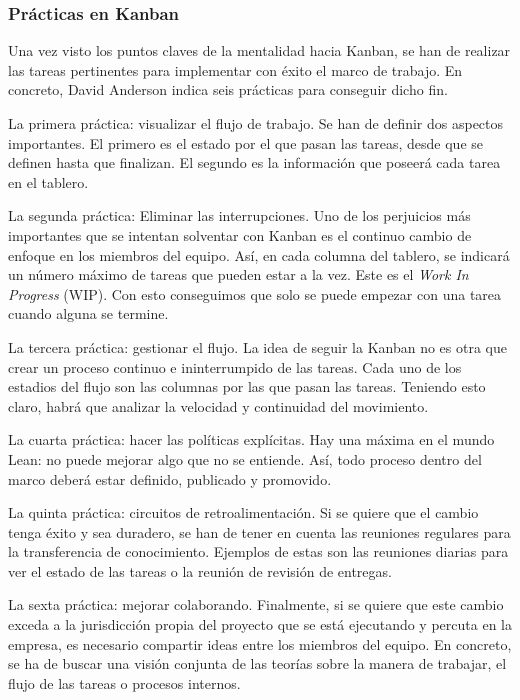 
\subsubsection{Prácticas en Kanban}
Una vez visto los puntos claves de la mentalidad hacia Kanban, se han de realizar las tareas pertinentes para implementar con éxito el marco de trabajo. En concreto, David Anderson indica seis prácticas para conseguir dicho fin.

La primera práctica: visualizar el flujo de trabajo. Se han de definir dos aspectos importantes. El primero es el estado por el que pasan las tareas, desde que se definen hasta que finalizan. El segundo es la información que poseerá cada tarea en el tablero.

La segunda práctica: Eliminar las interrupciones. Uno de los perjuicios más importantes que se intentan solventar con Kanban es el continuo cambio de enfoque en los miembros del equipo. Así, en cada columna del tablero, se indicará un número máximo de tareas que pueden estar a la vez. Este es el \textit{Work In Progress} (WIP). Con esto conseguimos que solo se puede empezar con una tarea cuando alguna se termine.

La tercera práctica: gestionar el flujo. La idea de seguir la Kanban no es otra que crear un proceso continuo e ininterrumpido de las tareas. Cada uno de los estadios del flujo son las columnas por las que pasan las tareas. Teniendo esto claro, habrá que analizar la velocidad y continuidad del movimiento.

La cuarta práctica: hacer las políticas explícitas. Hay una máxima en el mundo Lean: no puede mejorar algo que no se entiende. Así, todo proceso dentro del marco deberá estar definido, publicado y promovido.

La quinta práctica: circuitos de retroalimentación. Si se quiere que el cambio tenga éxito y sea duradero, se han de tener en cuenta las reuniones regulares para la transferencia de conocimiento. Ejemplos de estas son las reuniones diarias para ver el estado de las tareas o la reunión de revisión de entregas.

La sexta práctica: mejorar colaborando. Finalmente, si se quiere que este cambio exceda a la jurisdicción propia del proyecto que se está ejecutando y percuta en la empresa, es necesario compartir ideas entre los miembros del equipo. En concreto, se ha de buscar una visión conjunta de las teorías sobre la manera de trabajar, el flujo de las tareas o procesos internos.

